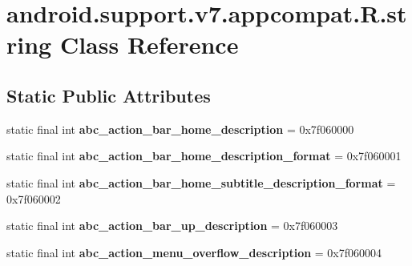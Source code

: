 \hypertarget{classandroid_1_1support_1_1v7_1_1appcompat_1_1_r_1_1string}{}\section{android.\+support.\+v7.\+appcompat.\+R.\+string Class Reference}
\label{classandroid_1_1support_1_1v7_1_1appcompat_1_1_r_1_1string}
\subsection*{Static Public Attributes}
\begin{DoxyCompactItemize}
\item 
\hypertarget{classandroid_1_1support_1_1v7_1_1appcompat_1_1_r_1_1string_ab2d2b1d0da0214cbe08414e3b8aeead9}{}static final int {\bfseries abc\+\_\+action\+\_\+bar\+\_\+home\+\_\+description} = 0x7f060000\label{classandroid_1_1support_1_1v7_1_1appcompat_1_1_r_1_1string_ab2d2b1d0da0214cbe08414e3b8aeead9}

\item 
\hypertarget{classandroid_1_1support_1_1v7_1_1appcompat_1_1_r_1_1string_ad59fccdbb8ada7347f02ffdb92d7da9c}{}static final int {\bfseries abc\+\_\+action\+\_\+bar\+\_\+home\+\_\+description\+\_\+format} = 0x7f060001\label{classandroid_1_1support_1_1v7_1_1appcompat_1_1_r_1_1string_ad59fccdbb8ada7347f02ffdb92d7da9c}

\item 
\hypertarget{classandroid_1_1support_1_1v7_1_1appcompat_1_1_r_1_1string_ab301aa506d8cfcf2cb74a816212deb90}{}static final int {\bfseries abc\+\_\+action\+\_\+bar\+\_\+home\+\_\+subtitle\+\_\+description\+\_\+format} = 0x7f060002\label{classandroid_1_1support_1_1v7_1_1appcompat_1_1_r_1_1string_ab301aa506d8cfcf2cb74a816212deb90}

\item 
\hypertarget{classandroid_1_1support_1_1v7_1_1appcompat_1_1_r_1_1string_a3a4f65bf9f2bdae055c146bca7613520}{}static final int {\bfseries abc\+\_\+action\+\_\+bar\+\_\+up\+\_\+description} = 0x7f060003\label{classandroid_1_1support_1_1v7_1_1appcompat_1_1_r_1_1string_a3a4f65bf9f2bdae055c146bca7613520}

\item 
\hypertarget{classandroid_1_1support_1_1v7_1_1appcompat_1_1_r_1_1string_a3985456499fd328f556a626481695499}{}static final int {\bfseries abc\+\_\+action\+\_\+menu\+\_\+overflow\+\_\+description} = 0x7f060004\label{classandroid_1_1support_1_1v7_1_1appcompat_1_1_r_1_1string_a3985456499fd328f556a626481695499}


\end{DoxyCompactItemize}
